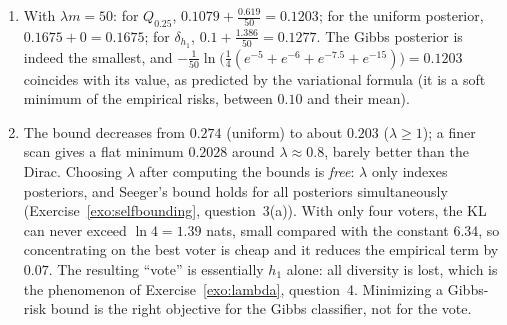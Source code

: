 \documentclass[11pt]{article}
\newcounter{exo}
\begin{document}
\begin{solution}
\begin{enumerate}
\begin{center}
\begin{tabular}{lccccc}
      \end{tabular}
      \end{center}
      (The Dirac on $h_1$ has $\KL=\ln4$, the Occam price of selecting one voter out of four.) Seeger's bound is always tighter than McAllester's, by $0.02$ to $0.036$, the gap growing as the posterior concentrates on voters with small empirical risk (the risks are far from $\frac12$).
\item With $\lambda m=50$: for $Q_{0.25}$, $0.1079+\frac{0.619}{50}=0.1203$; for the uniform posterior, $0.1675+0=0.1675$; for
      $\delta_{h_1}$, $0.1+\frac{1.386}{50}=0.1277$. The Gibbs posterior is indeed the smallest, and
      $-\frac1{50}\ln\big(\frac14(e^{-5}+e^{-6}+e^{-7.5}+e^{-15})\big)=0.1203$ coincides with its value, as predicted by the
      variational formula (it is a soft minimum of the empirical risks, between $0.10$ and their mean).
\item The bound decreases from $0.274$ (uniform) to about $0.203$ ($\lambda\geq1$); a finer scan gives a flat minimum
      $0.2028$ around $\lambda\approx0.8$, barely better than the Dirac. Choosing $\lambda$ after computing the bounds is
      \emph{free}: $\lambda$ only indexes posteriors, and Seeger's bound holds for all posteriors simultaneously
      (Exercise~\ref{exo:selfbounding}, question~3(a)). With only four voters, the KL can never exceed $\ln4=1.39$ nats,
      small compared with the constant $6.34$, so concentrating on the best voter is cheap and it reduces the
      empirical term by $0.07$. The resulting ``vote'' is essentially $h_1$ alone: all diversity is lost, which is the
      phenomenon of Exercise~\ref{exo:lambda}, question~4. Minimizing a Gibbs-risk bound is the right objective for
      the Gibbs classifier, not for the vote.
\end{enumerate}
\end{solution}
\end{document}
